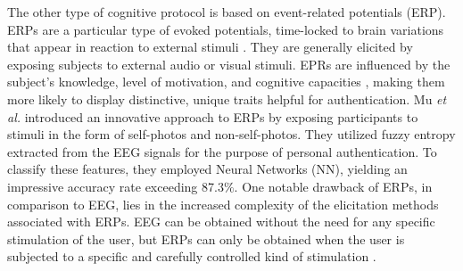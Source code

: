The other type of cognitive protocol is based on event-related potentials (ERP). ERPs are a particular type of evoked potentials, time-locked to brain variations that appear in reaction to external stimuli \cite{zhang2021review}. They are generally elicited by exposing subjects to external audio or visual stimuli. EPRs are influenced by the subject's knowledge, level of motivation, and cognitive capacities \cite{blackwood1990cognitive}, making them more likely to display distinctive, unique traits helpful for authentication. Mu \textit{et al.} \cite{mu2016eeg} introduced an innovative approach to ERPs by exposing participants to stimuli in the form of self-photos and non-self-photos. They utilized fuzzy entropy extracted from the EEG signals for the purpose of personal authentication. To classify these features, they employed Neural Networks (NN), yielding an impressive accuracy rate exceeding 87.3$\%$. One notable drawback of ERPs, in comparison to EEG, lies in the increased complexity of the elicitation methods associated with ERPs. EEG can be obtained without the need for any specific stimulation of the user, but ERPs can only be obtained when the user is subjected to a specific and carefully controlled kind of stimulation \cite{survey_brain_biometrics}.




